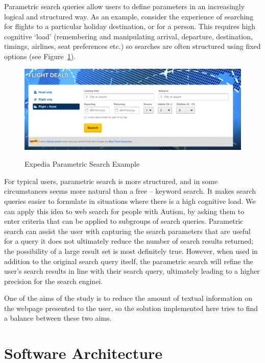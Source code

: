 \documentclass[a4paper, 11pt]{article}
\begin{document}
Parametric search queries allow users to define parameters in an increasingly logical and structured way. As an example, consider the experience of searching for flights to a particular holiday destination, or for a person. This requires high cognitive ‘load’ (remembering and manipulating arrival, departure, destination, timings, airlines, seat preferences etc.) so searches are often structured using fixed options (see Figure~\ref{exped}).

\begin{figure}[H]
\begin{center}
\includegraphics[scale=0.3]{expedia}\\

\caption{Expedia Parametric Search Example}
\label{exped}
\end{center}
\end{figure}

For typical users, parametric search is more structured, and in some circumstances seems more natural than a free – keyword search. It makes search queries easier to formulate in situations where there is a high cognitive load.  We can apply this idea to web search for people with Autism, by asking them to enter criteria that can be applied to subgroups of search queries. Parametric search can assist the user with capturing the search parameters that are useful for a query it does not ultimately reduce the number of search results returned; the possibility of a large result set is most definitely true. However, when used in addition to the original search query itself, the parametric search will refine the user’s search results in line with their search query, ultimately leading to a higher precision for the search enginei.

One of the aims of the study is to reduce the amount of textual information on the webpage presented to the user, so the solution implemented here tries to find a balance between these two aims.   




\section{Software Architecture}
\end{document}
